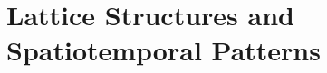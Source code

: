 \documentclass{article}
\begin{document}





\newpage

\section{\label{sec:latticeStructure}Lattice Structures and Spatiotemporal Patterns}
\end{document}
